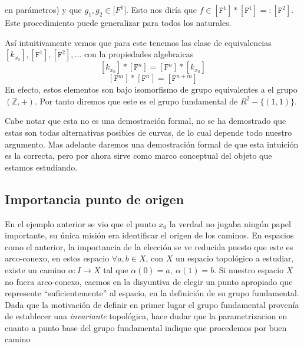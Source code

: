{\begin{ejemplo}
\begin{itemize}
  en parámetros) y que \(g_1, g_2 \in \mathtt [F ^1]\). Esto nos diría que
  \( f \in [\mathtt F ^1] * [\mathtt F ^1] =: [\mathtt F ^2]\). Este
  procedimiento puede generalizar para todos los naturales.
\end{itemize}
Así intuitivamente vemos que para este tenemos las clase de
equivalencias \([k_{x_0}], [\mathtt F ^1], [\mathtt F ^2], \dots \) con
la propiedades algebraicas
\[ [k_{x_0}] * [\mathtt F ^n] = [\mathtt F ^n] * [k_{x_0}]\]
\[ [\mathtt F ^m]  * [\mathtt F ^n] = [\mathtt F ^{n + m}]\]
En efecto, estos elementos son bajo isomorfismo de grupo equivalentes a
el grupo \((\mathbb{Z}, +)\). Por tanto diremos que este es el grupo
fundamental de \(R^2 - \{(1,1)\}\).
\end{ejemplo}

Cabe notar que esta no es una demostración formal, no se ha demostrado
que estas son todas alternativas posibles de curvas, de lo cual depende
todo nuestro argumento. Mas adelante daremos una demostración formal de
que esta intuición es la correcta, pero por ahora sirve como marco
conceptual del objeto que estamos estudiando.

\subsection{Importancia punto de origen}
En el ejemplo anterior se vio que el punto \(x_0\) la verdad no
jugaba ningún papel importante, su única misión era identificar el
origen de los caminos. En espacios como el anterior, la importancia de
la elección se ve reducida puesto que este es arco-conexo, en estos
espacio \(\forall a,b \in X\), con \(X\) un espacio topológico a
estudiar, existe un camino \(\alpha : I \to X\) tal que \(\alpha (0) =
a,\ \alpha (1) = b\). Si nuestro espacio \(X\) no fuera arco-conexo,
caemos en la disyuntiva de elegir un punto apropiado que represente
``suficientemente'' al espacio, en la definición de su grupo
fundamental. Dada que la motivación de definir en primer lugar el grupo
fundamental provenía de establecer una \emph{invariante} topológica,
hace dudar que la parametrizacion en cuanto a punto base del grupo
fundamental indique que procedemos por buen camino

}
